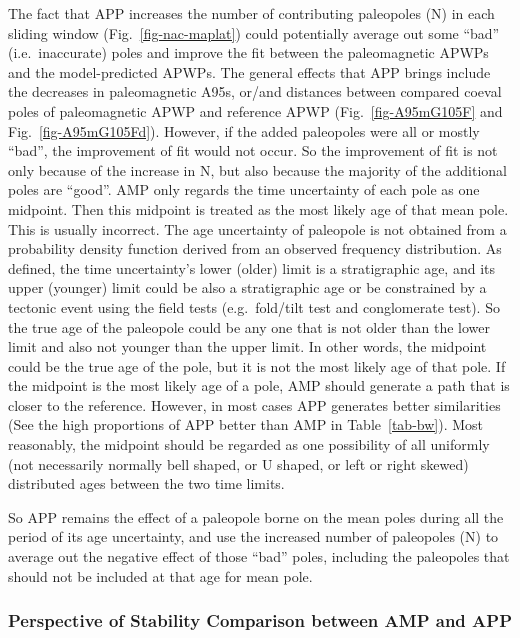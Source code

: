 The fact that APP increases the number of contributing paleopoles (N) in each
sliding window (Fig.~\ref{fig-nac-maplat}) could potentially average out some
``bad'' (i.e.\ inaccurate) poles and improve the fit between the paleomagnetic
APWPs and the model-predicted APWPs. The general effects that APP brings include
the decreases in paleomagnetic A95s, or/and distances between compared coeval
poles of paleomagnetic APWP and reference APWP (Fig.~\ref{fig-A95mG105F} and
Fig.~\ref{fig-A95mG105Fd}). However, if the added paleopoles were all or mostly
``bad'', the improvement of fit would not occur. So the improvement of fit is
not only because of the increase in N, but also because the majority of the
additional poles are ``good''. AMP only regards the time uncertainty of each
pole as one midpoint. Then this midpoint is treated as the most likely age of
that mean pole. This is usually incorrect. The age uncertainty of paleopole is
not obtained from a probability density function derived from an observed
frequency distribution. As defined, the time uncertainty's lower (older) limit
is a stratigraphic age, and its upper (younger) limit could be also a
stratigraphic age or be constrained by a tectonic event using the field tests
(e.g.\ fold/tilt test and conglomerate test). So the true age of the paleopole
could be any one that is not older than the lower limit and also not younger
than the upper limit. In other words, the midpoint could be the true age of the
pole, but it is not the most likely age of that pole. If the midpoint is the
most likely age of a pole, AMP should generate a path that is closer to the
reference. However, in most cases APP generates better similarities (See the
high proportions of APP better than AMP in Table~\ref{tab-bw}). Most reasonably,
the midpoint should be regarded as one possibility of all uniformly (not
necessarily normally bell shaped, or U shaped, or left or right skewed)
distributed ages between the two time limits.

So APP remains the effect of a paleopole borne on the mean poles during all the
period of its age uncertainty, and use the increased number of paleopoles (N)
to average out the negative effect of those ``bad'' poles, including the
paleopoles that should not be included at that age for mean pole.

\subsubsection{Perspective of Stability Comparison between AMP and APP}

